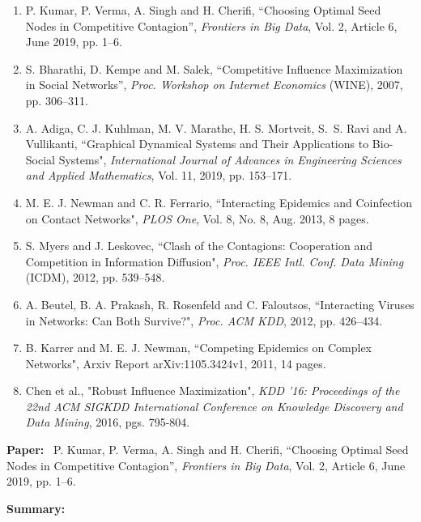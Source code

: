\documentclass[11pt]{article}
\begin{document}
\begin{enumerate}
\item   P. Kumar, P. Verma, A. Singh and H. Cherifi,
``Choosing Optimal Seed Nodes in Competitive Contagion”, 
\emph{Frontiers in Big Data}, Vol. 2, Article 6, June 2019, pp. 1--6.

\item S. Bharathi, D. Kempe and M. Salek, ``Competitive Influence 
Maximization in Social Networks”, \emph{Proc. Workshop on Internet Economics}
(WINE), 2007, pp. 306--311.

\item A. Adiga, C. J. Kuhlman, M. V. Marathe, H. S. Mortveit, 
S.~S. Ravi and A. Vullikanti, ``Graphical Dynamical Systems and Their
Applications to Bio-Social Systems", \emph{International Journal of Advances
in Engineering Sciences and Applied Mathematics}, Vol. 11, 2019, pp. 153--171.

\item M. E. J. Newman and C. R. Ferrario, ``Interacting Epidemics and 
Coinfection on Contact Networks", \emph{PLOS One}, Vol. 8, No. 8, Aug. 2013,
8 pages.

\item S. Myers and J. Leskovec, ``Clash of the Contagions: Cooperation and 
Competition in Information Diffusion", \emph{Proc. IEEE Intl. Conf. Data Mining}
(ICDM), 2012, pp. 539--548.

\item A. Beutel, B. A. Prakash, R. Rosenfeld and C. Faloutsos,
``Interacting Viruses in Networks: Can Both Survive?", 
\emph{Proc. ACM KDD}, 2012, pp. 426--434.

\item B. Karrer and M. E. J. Newman, ``Competing Epidemics on Complex Networks",
Arxiv Report arXiv:1105.3424v1, 2011, 14 pages.

\item Chen et al., "Robust Influence Maximization", \emph{KDD '16: Proceedings of the 22nd ACM SIGKDD International Conference on Knowledge Discovery and Data Mining}, 2016, pgs. 795-804.
\end{enumerate}

\clearpage

\noindent
\textbf{Paper:}~  P. Kumar, P. Verma, A. Singh and H. Cherifi, 
``Choosing Optimal Seed Nodes in Competitive Contagion”, 
\emph{Frontiers in Big Data}, Vol. 2, Article 6, June 2019, pp. 1--6.

\medskip

\noindent
\textbf{Summary:}
\end{document}
